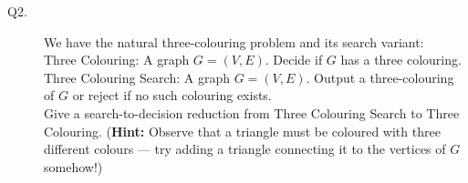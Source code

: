 \documentclass{csc_assignment}
\begin{document}
\begin{description}
\newpage
\item[Q2.]
We have the natural three-colouring problem and its search variant:\\
Three Colouring: A graph $G = (V, E)$. Decide if $G$ has a three colouring.\\
Three Colouring Search: A graph $G = (V, E)$. Output a three-colouring of $G$ or reject if no such colouring exists.\\
  Give a search-to-decision reduction from Three Colouring Search to Three Colouring. ({\bf Hint:} Observe that a triangle must be coloured with three different colours --- try adding a triangle connecting it to the vertices of $G$ somehow!)\\


\end{description}
\end{document}
